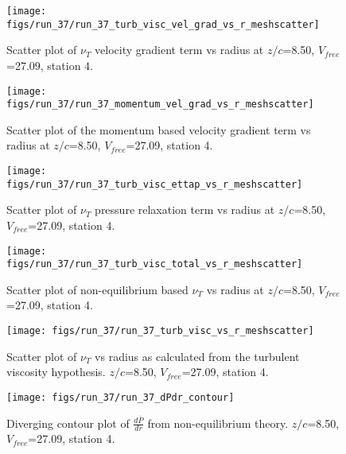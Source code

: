 \begin{figure}[H]
\centering
\texttt{[image: figs/run\_37/run\_37\_turb\_visc\_vel\_grad\_vs\_r\_meshscatter]}
\caption{Scatter plot of $\nu_T$ velocity gradient term vs radius at $z/c$=8.50, $V_{free}$=27.09, station 4.}
\end{figure}


\begin{figure}[H]
\centering
\texttt{[image: figs/run\_37/run\_37\_momentum\_vel\_grad\_vs\_r\_meshscatter]}
\caption{Scatter plot of the momentum based velocity gradient term vs radius at $z/c$=8.50, $V_{free}$=27.09, station 4.}
\end{figure}


\begin{figure}[H]
\centering
\texttt{[image: figs/run\_37/run\_37\_turb\_visc\_ettap\_vs\_r\_meshscatter]}
\caption{Scatter plot of $\nu_T$ pressure relaxation term vs radius at $z/c$=8.50, $V_{free}$=27.09, station 4.}
\end{figure}


\begin{figure}[H]
\centering
\texttt{[image: figs/run\_37/run\_37\_turb\_visc\_total\_vs\_r\_meshscatter]}
\caption{Scatter plot of non-equilibrium based $\nu_T$ vs radius at $z/c$=8.50, $V_{free}$=27.09, station 4.}
\end{figure}


\begin{figure}[H]
\centering
\texttt{[image: figs/run\_37/run\_37\_turb\_visc\_vs\_r\_meshscatter]}
\caption{Scatter plot of $\nu_T$ vs radius as calculated from the turbulent viscosity hypothesis. $z/c$=8.50, $V_{free}$=27.09, station 4.}
\end{figure}


\begin{figure}[H]
\centering
\texttt{[image: figs/run\_37/run\_37\_dPdr\_contour]}
\caption{Diverging contour plot of $\frac{d\bar{P}}{dr}$ from non-equilibrium theory. $z/c$=8.50, $V_{free}$=27.09, station 4.}
\end{figure}


